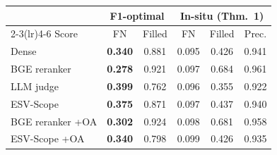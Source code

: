\setlength{\tabcolsep}{3pt}
\begin{tabular}{lccccc}
\toprule
 & \multicolumn{2}{c}{F1-optimal} & \multicolumn{3}{c}{In-situ (Thm.~1)} \\
\cmidrule(lr){2-3}\cmidrule(lr){4-6}
Score & FN & Filled & FN & Filled & Prec. \\
\midrule
Dense & \textbf{0.340} & 0.881 & 0.095 & 0.426 & 0.941 \\
BGE reranker & \textbf{0.278} & 0.921 & 0.097 & 0.684 & 0.961 \\
LLM judge & \textbf{0.399} & 0.762 & 0.096 & 0.355 & 0.922 \\
ESV-Scope & \textbf{0.375} & 0.871 & 0.097 & 0.437 & 0.940 \\
BGE reranker +OA & \textbf{0.302} & 0.924 & 0.098 & 0.681 & 0.958 \\
ESV-Scope +OA & \textbf{0.340} & 0.798 & 0.099 & 0.426 & 0.935 \\
\bottomrule
\end{tabular}
